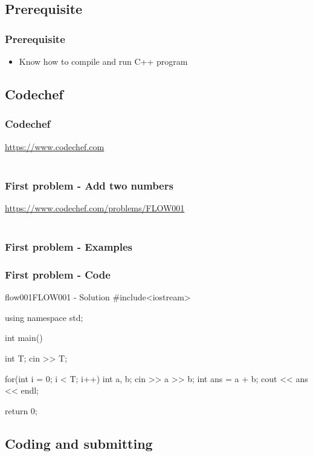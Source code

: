 \subsection{Prerequisite}
\begin{frame}
    \frametitle{Prerequisite}
    \begin{itemize}
        \item Know how to compile and run C++ program
    \end{itemize}
\end{frame}

\subsection{Codechef}
\begin{frame}
    \frametitle{Codechef}
    \href{https://www.codechef.com}{https://www.codechef.com} \\
    \\
\end{frame}
\begin{frame}
    \frametitle{First problem - Add two numbers}
    \href{https://www.codechef.com/problems/FLOW001}{https://www.codechef.com/problems/FLOW001} \\
    \\
\end{frame}
\begin{frame}
    \frametitle{First problem - Examples}
\end{frame}

\begin{frame}[fragile]
    \frametitle{First problem - Code}
    \begin{code}{flow001}{FLOW001 - Solution}
#include<iostream>

using namespace std;

int main() {
    int T;
    cin >> T;
    
    for(int i = 0; i < T; i++) {
    	int a, b;
    	cin >> a >> b;
    	int ans = a + b;
    	cout << ans << endl;
    }
    	
    return 0;
}
    \end{code}
\end{frame}

\subsection{Coding and submitting}

